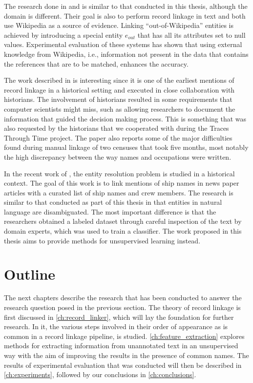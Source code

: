 The research done in \citep{Cucerzan2007} and \citep{Bunescu2006} is similar to that conducted in this thesis, although the domain is different.
Their goal is also to perform record linkage in text and both use Wikipedia as a source of evidence.
Linking ``out-of-Wikipedia''\citep{Bunescu2006} entities is achieved by introducing a special entity $e_{out}$ that has all its attributes set to null values.
Experimental evaluation of these systems has shown that using external knowledge from Wikipedia, i.e., information not present in the data that contains the references that are to be matched, enhances the accuracy.

The work described in \citep{Winchester1970} is interesting since it is one of the earliest mentions of record linkage in a historical setting and executed in close collaboration with historians.
The involvement of historians resulted in some requirements that computer scientists might miss, such as allowing researchers to document the information that guided the decision making process.
This is something that was also requested by the historians that we cooperated with during the Traces Through Time project.
The paper also reports some of the major difficulties found during manual linkage of two censuses that took five months, most notably the high discrepancy between the way names and occupations were written.

In the recent work of \citep{Balado2015}, the entity resolution problem is studied in a historical context.
The goal of this work is to link mentions of ship names in news paper articles with a curated list of ship names and crew members.
The research is similar to that conducted as part of this thesis in that entities in natural language are disambiguated.
The most important difference is that the researchers obtained a labeled dataset through careful inspection of the text by domain experts, which was used to train a classifier.
The work proposed in this thesis aims to provide methods for unsupervised learning instead.




\section{Outline}
\label{sec:outline}

The next chapters describe the research that has been conducted to answer the research question posed in the previous section.
The theory of record linkage is first discussed in \cref{ch:record_linker}, which will lay the foundation for further research.
In it, the various steps involved in their order of appearance as is common in a record linkage pipeline, is studied.
\cref{ch:feature_extraction} explores methods for extracting information from unannotated text in an unsupervised way with the aim of improving the results in the presence of common names.
The results of experimental evaluation that was conducted will then be described in \cref{ch:experiments}, followed by our conclusions in \cref{ch:conclusions}.